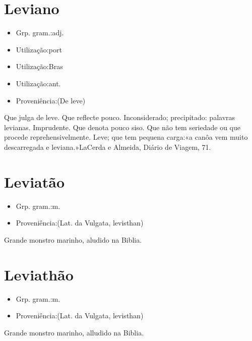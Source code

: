 \section{Leviano}
\begin{itemize}
\item {Grp. gram.:adj.}
\end{itemize}
\begin{itemize}
\item {Utilização:port}
\end{itemize}
\begin{itemize}
\item {Utilização:Bras}
\end{itemize}
\begin{itemize}
\item {Utilização:ant.}
\end{itemize}
\begin{itemize}
\item {Proveniência:(De \textunderscore leve\textunderscore )}
\end{itemize}
Que julga de leve.
Que reflecte pouco.
Inconsiderado; precipitado: \textunderscore palavras levianas\textunderscore .
Imprudente.
Que denota pouco siso.
Que não tem seriedade ou que procede reprehensivelmente.
Leve; que tem pequena carga:«\textunderscore a canôa vem muito descarregada e leviana.\textunderscore »LaCerda e Almeida, \textunderscore Diário de Viagem\textunderscore , 71.
\section{Leviatão}
\begin{itemize}
\item {Grp. gram.:m.}
\end{itemize}
\begin{itemize}
\item {Proveniência:(Lat. da \textunderscore Vulgata\textunderscore , \textunderscore levisthan\textunderscore )}
\end{itemize}
Grande monstro marinho, aludido na \textunderscore Biblia\textunderscore .
\section{Leviathão}
\begin{itemize}
\item {Grp. gram.:m.}
\end{itemize}
\begin{itemize}
\item {Proveniência:(Lat. da \textunderscore Vulgata\textunderscore , \textunderscore levisthan\textunderscore )}
\end{itemize}
Grande monstro marinho, alludido na \textunderscore Biblia\textunderscore .

